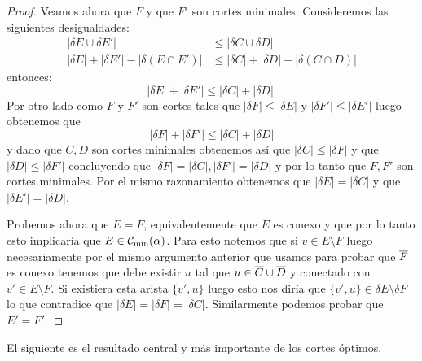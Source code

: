 \documentclass[tesis.tex]{subfiles}
\begin{document}
\begin{proof}
	Veamos ahora que $F$ y que $F'$ son cortes minimales.
	Consideremos las siguientes desigualdades:
	\begin{align*}
		|\delta E \cup \delta E'| & \le |\delta C \cup \delta D| \\
		|\delta E| + |\delta E'| - |\delta (E \cap E')| & \le |\delta C| + |\delta D| - |\delta (C \cap D)|
	\end{align*}
	entonces:
	\[
	|\delta E| + |\delta E'| \le |\delta C| + |\delta D|.
	\]	
	Por otro lado como $F$ y $F'$ son cortes tales que $|\delta F| \le |\delta E|$ y $|\delta F'| \le |\delta E'|$ luego obtenemos que
	\[
	|\delta F| + |\delta F'| \le |\delta C| + |\delta D|
	\] 
	y dado que $C,D$ son cortes minimales obtenemos así que $|\delta C| \le |\delta F|$ y que $|\delta D| \le |\delta F'|$ concluyendo que $|\delta F | = |\delta C|, |\delta F'| = |\delta D|$ y por lo tanto que $F,F'$ son cortes minimales.
	Por el mismo razonamiento obtenemos que $|\delta E| = |\delta C|$ y que $|\delta E'| = |\delta D|$.
	
	Probemos ahora que $E=F$, equivalentemente que $E$ es conexo y que por lo tanto esto implicaría que $E \in {\cal C}_{\text{min}}(\alpha)$.
	Para esto notemos que si $v \in E \setminus F$ luego necesariamente por el mismo argumento anterior que usamos para probar que $\overline F$ es conexo tenemos que debe existir $u$ tal que $u \in \overline C \cup \overline D$ y conectado con $v' \in E \setminus F$.
	Si existiera esta arista $\{v',u \}$ luego esto nos diría que $\{v',u \} \in \delta E \setminus \delta F$ lo que contradice que $|\delta E| = |\delta F| = |\delta C|$.
	Similarmente podemos probar que $E' = F'$.
\end{proof}


El siguiente es el resultado central y más importante de los cortes óptimos.
\end{document}
